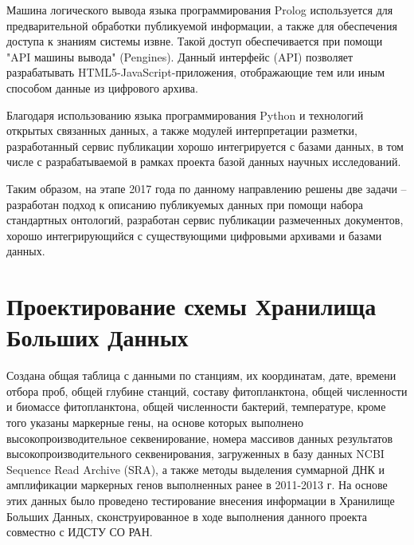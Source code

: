 \documentclass[a4paper,12pt,openany,final]{extreport}
\begin{document}
Машина логического вывода языка программирования Prolog используется для
предварительной обработки публикуемой информации, а также для
обеспечения доступа к знаниям системы извне. Такой доступ обеспечивается
при помощи "API машины вывода" (Pengines). Данный интерфейс (API)
позволяет разрабатывать HTML5-JavaScript-приложения, отображающие тем
или иным способом данные из цифрового архива.

Благодаря использованию языка программирования Python и технологий
открытых связанных данных, а также модулей интерпретации разметки,
разработанный сервис публикации хорошо интегрируется с базами данных, в
том числе с разрабатываемой в рамках проекта базой данных научных
исследований.

Таким образом, на этапе 2017 года по данному направлению решены две
задачи -- разработан подход к описанию публикуемых данных при помощи
набора стандартных онтологий, разработан сервис публикации размеченных
документов, хорошо интегрирующийся с существующими цифровыми архивами и
базами данных.

\chapter{Проектирование схемы Хранилища Больших Данных}\label{chap:8}

Создана общая таблица с данными по станциям, их координатам, дате,
времени отбора проб, общей глубине станций, составу фитопланктона, общей
численности и биомассе фитопланктона, общей численности бактерий,
температуре, кроме того указаны маркерные гены, на основе которых
выполнено высокопроизводительное секвенирование, номера массивов данных
результатов высокопроизводительного секвенирования, загруженных в базу
данных NCBI Sequence Read Archive (SRA), а также методы выделения
суммарной ДНК и амплификации маркерных генов выполненных ранее в
2011-2013 г. На основе этих данных было проведено тестирование внесения
информации в Хранилище Больших Данных, сконструированное в ходе
выполнения данного проекта совместно с ИДСТУ СО РАН.
\end{document}

